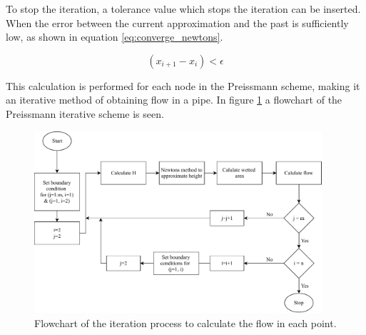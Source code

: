 
To stop the iteration, a tolerance value which stops the iteration can be inserted. When the error between the current approximation and the past is sufficiently low, as shown in equation \ref{eq:converge_newtons}.

\begin{equation}\label{eq:converge_newtons}
     \left( x_{i+1}-x_i \right) < \epsilon 
\end{equation}


This calculation is performed for each node in the Preissmann scheme, making it an iterative method of obtaining flow in a pipe. 
In figure \ref{fig:flow_chart_iteration} a flowchart of the Preissmann iterative scheme is seen.
\begin{figure}[H]
    \centering
    \includegraphics[width=0.95\textwidth]{report/simulation/pictures/flow_chart_iteration.pdf}
    \caption{Flowchart of the iteration process to calculate the flow in each point.}
    \label{fig:flow_chart_iteration}
\end{figure}

